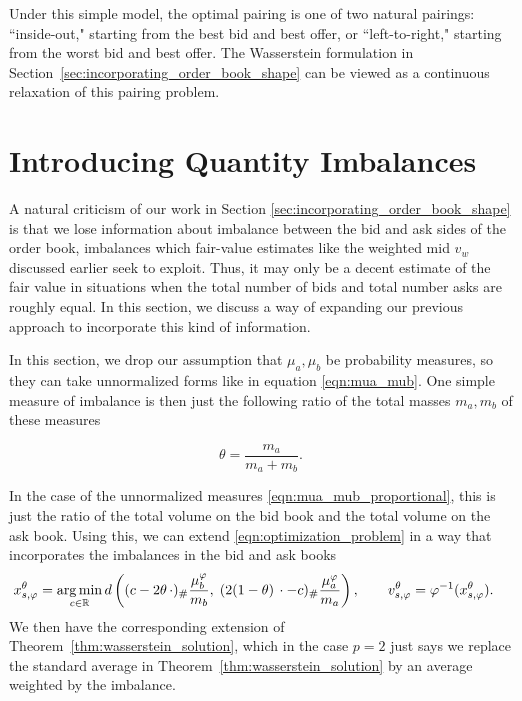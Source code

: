 Under this simple model, the optimal pairing is one of two natural pairings:
``inside-out," starting from the best bid and best offer, or ``left-to-right,"
starting from the worst bid and best offer. The Wasserstein formulation in
Section~\ref{sec:incorporating_order_book_shape} can be viewed as a continuous
relaxation of this pairing problem.


\section{Introducing Quantity Imbalances}
\label{sec:quantity_imbalances}

A natural criticism of our work in Section \ref{sec:incorporating_order_book_shape}
 is that we lose information about imbalance between the bid and ask
  sides of the order book, imbalances which fair-value estimates
  like the weighted mid $v_w$ discussed earlier seek to exploit.
  Thus, it may only be a decent estimate of the fair value in
  situations when the total number of bids and total number asks
   are roughly equal. In this section, we discuss a way of expanding
   our previous approach to incorporate this kind of information.

In this section, we drop our assumption that $\mu_a, \mu_b$ be
probability measures, so they can take unnormalized forms like in
equation \eqref{eqn:mua_mub}. One simple measure of imbalance is
then just the following ratio of the total masses $m_a, m_b$ of
these measures
%

\begin{equation}
    \theta = \frac{m_a}{m_a + m_b}.
    \label{eqn:imbalance_ratio_theta}
\end{equation}

%

\noindent In the case of the unnormalized measures
\eqref{eqn:mua_mub_proportional}, this is just the ratio of the total
volume on the bid book and the total volume on the ask book.
Using this, we can extend \eqref{eqn:optimization_problem} in a way
 that incorporates the imbalances in the bid and ask books
%
\begin{align}
        x_{s,\varphi}^\theta & = \operatorname*{arg\,min}_{c \in \mathbb R}
        d\left((c-2\theta\,\cdot)_\#\frac{\mu_b^\varphi}{m_b},\;
        (2(1-\theta)\,\cdot-c)_\#\frac{\mu_a^\varphi}{m_a}\right),
        \qquad v_{s,\varphi}^\theta=\varphi^{-1}(x_{s,\varphi}^\theta).
        \label{eqn:imbalanced_optimization_problem}
\end{align}
%
\noindent We then have the corresponding extension of
Theorem~\ref{thm:wasserstein_solution}, which in the case $p=2$
just says we replace the standard average in
Theorem~\ref{thm:wasserstein_solution} by an average weighted
 by the imbalance.


